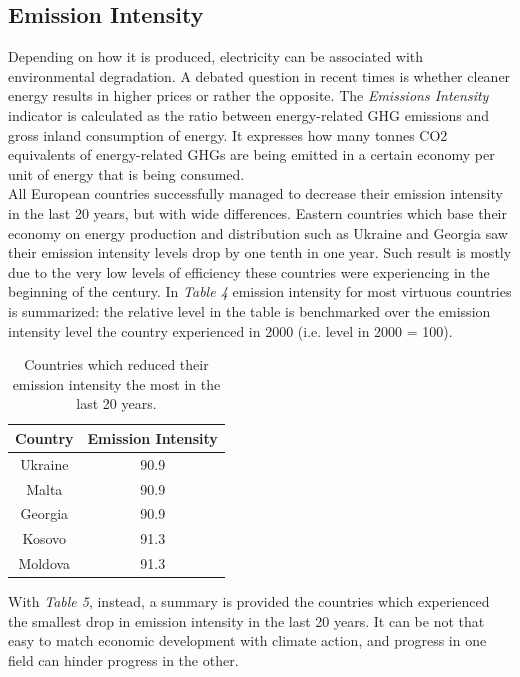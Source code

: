\documentclass{book}
\begin{document}
\subsection*{Emission Intensity}

Depending on how it is produced, electricity can be associated with environmental degradation. A debated question in recent times is whether cleaner energy results in higher prices or rather the opposite. The \textit{Emissions Intensity} indicator is calculated as the ratio between energy-related GHG emissions and gross inland consumption of energy. It expresses how many tonnes CO2 equivalents of energy-related GHGs are being emitted in a certain economy per unit of energy that is being consumed.\\

All European countries successfully managed to decrease their emission intensity in the last 20 years, but with wide differences. Eastern countries which base their economy on energy production and distribution such as Ukraine and Georgia saw their emission intensity levels drop by one tenth in one year. Such result is mostly due to the very low levels of efficiency these countries were experiencing in the beginning of the century. In \textit{Table 4} emission intensity for most virtuous countries is summarized: the relative level in the table is benchmarked over the emission intensity level the country experienced in 2000 (i.e. level in 2000 = 100).

\bigskip
\begin{table}[H]
\begin{center}
\begin{tabular}{|c|c|}
\hline
Country & Emission Intensity \\
\hline
Ukraine & 90.9\\
Malta & 90.9\\
Georgia & 90.9\\
Kosovo & 91.3\\
Moldova & 91.3\\
\hline
\end{tabular}
\caption{Countries which reduced their emission intensity the most in the last 20 years.}
\end{center}
\end{table}

With \textit{Table 5}, instead, a summary is provided the countries which experienced the smallest drop in emission intensity in the last 20 years. It can be not that easy to match economic development with climate action, and progress in one field can hinder progress in the other.
\end{document}
